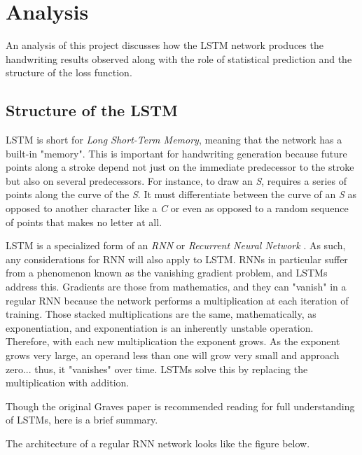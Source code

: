 \documentclass{article}
\begin{document}
\section{Analysis}
An analysis of this project discusses how the LSTM network produces the handwriting results observed along with the role of statistical prediction and the structure of the loss function.

\subsection{Structure of the LSTM}
LSTM is short for \textit{Long Short-Term Memory}, meaning that the network has a built-in "memory". This is important for handwriting generation because future points along a stroke depend not just on the immediate predecessor to the stroke but also on several predecessors. For instance, to draw an \textit{S}, requires a series of points along the curve of the \textit{S}. It must differentiate between the curve of an \textit{S} as opposed to another character like a \textit{C} or even as opposed to a random sequence of points that makes no letter at all.

LSTM is a specialized form of an \textit{RNN} or \textit{Recurrent Neural Network} \cite{lstm-intro}. As such, any considerations for RNN will also apply to LSTM. RNNs in particular suffer from a phenomenon known as the vanishing gradient problem, and LSTMs address this. Gradients are those from mathematics, and they can "vanish" in a regular RNN because the network performs a multiplication at each iteration of training. Those stacked multiplications are the same, mathematically, as exponentiation, and exponentiation is an inherently unstable operation. Therefore, with each new multiplication the exponent grows. As the exponent grows very large, an operand less than one will grow very small and approach zero... thus, it "vanishes" over time. LSTMs solve this by replacing the multiplication with addition.

Though the original Graves paper \cite{DBLP:journals/corr/Graves13} is recommended reading for full understanding of LSTMs, here is a brief summary. 

The architecture of a regular RNN network looks like the figure below.
\end{document}

